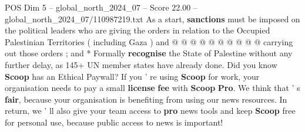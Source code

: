 \begin{textsample}{POS Dim 5 – global\_north\_2024\_07 – Score 22.00 – global\_north\_2024\_07/110987219.txt}
As a start, \textbf{sanctions} must be imposed on the political leaders who are giving the orders in relation to the Occupied Palestinian Territories ( including Gaza ) and @ @ @ @ @ @ @ @ @ @ carrying out those orders ; and * Formally \textbf{recognise} the State of Palestine without any further delay, as 145+ UN member states have already done.
Did you know \textbf{Scoop} has an Ethical Paywall?
If you ' re using \textbf{Scoop} for work, your organisation needs to pay a small \textbf{license} \textbf{fee} with \textbf{Scoop} \textbf{Pro}.
We think that ' s \textbf{fair}, because your organisation is benefiting from using our news resources.
In return, we ' ll also give your team access to \textbf{pro} news tools and keep \textbf{Scoop} free for personal use, because public access to news is important!

\end{textsample}
